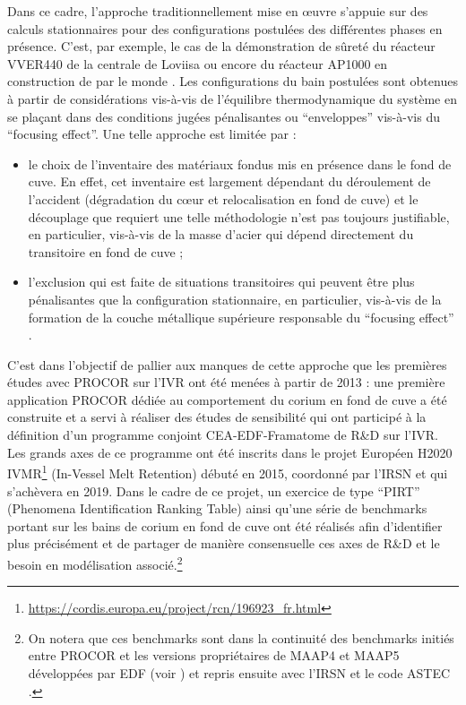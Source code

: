 Dans ce cadre, l'approche traditionnellement mise en \oe uvre s'appuie sur des calculs stationnaires pour des configurations postulées des différentes phases en présence. C'est, par exemple, le cas de la démonstration de sûreté du réacteur VVER440 de la centrale de Loviisa \cite{Kymalainen1997} ou encore du réacteur AP1000 en construction de par le monde \cite{Esmaili2004}. Les configurations du bain postulées sont obtenues à partir de considérations vis-à-vis de l'équilibre thermodynamique du système en se plaçant dans des conditions jugées pénalisantes ou ``enveloppes'' vis-à-vis du ``focusing effect''. Une telle approche est limitée par :
\begin{itemize}
 \item le choix de l'inventaire des matériaux fondus mis en présence dans le fond de cuve. En effet, cet inventaire est largement dépendant du déroulement de l'accident (dégradation du c\oe ur et relocalisation en fond de cuve) et le découplage que requiert une telle méthodologie n'est pas toujours justifiable, en particulier, vis-à-vis de la masse d'acier qui dépend directement du transitoire en fond de cuve \cite{Seiler2014} ;
 \item l’exclusion qui est faite de situations transitoires qui peuvent être plus pénalisantes que la configuration stationnaire, en particulier, vis-à-vis de la formation de la couche métallique supérieure responsable du ``focusing effect'' \cite{Rempe1998}.
\end{itemize}

C'est dans l'objectif de pallier aux manques de cette approche que les premières études avec PROCOR sur l'IVR ont été menées à partir de 2013 : une première application PROCOR dédiée au comportement du corium en fond de cuve a été construite et a servi à réaliser des études de sensibilité \cite{LeTellier2014} qui ont participé à la définition d'un programme conjoint CEA-EDF-Framatome de R\&D sur l'IVR. Les grands axes de ce programme ont été inscrits dans le projet Européen H2020 IVMR\footnote{\url{https://cordis.europa.eu/project/rcn/196923_fr.html}} (In-Vessel Melt Retention) débuté en 2015, coordonné par l'IRSN et qui s'achèvera en 2019. Dans le cadre de ce projet, un exercice de type ``PIRT'' (Phenomena Identification Ranking Table) \cite{Carenini2019a} ainsi qu'une série de benchmarks portant sur les bains de corium en fond de cuve \cite{Carenini2019} ont été réalisés afin d'identifier plus précisément et de partager de manière consensuelle ces axes de R\&D et le besoin en modélisation associé.\footnote{On notera que ces benchmarks sont dans la continuité des benchmarks initiés entre PROCOR et les versions propriétaires de MAAP4 \cite{maap4} et MAAP5 \cite{maap5} développées par EDF (voir \cite{Bakouta2015}) et repris ensuite avec l'IRSN et le code ASTEC \cite{Carenini2014}.}

